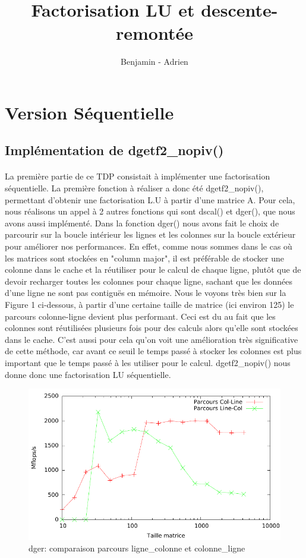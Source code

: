 \documentclass{article}
\title{Factorisation LU et descente-remontée}
\author{Benjamin \bsc{Angelaud} - Adrien \bsc{Guilbaud}}
\begin{document}
\maketitle

\section{Version Séquentielle}
\subsection{Implémentation de dgetf2\_nopiv()}
\paragraph{}La première partie de ce TDP consistait à implémenter une factorisation séquentielle. La première fonction à réaliser a donc été dgetf2\_nopiv(), permettant d'obtenir une factorisation L.U à partir d'une matrice A.  Pour cela, nous réalisons un appel à 2 autres fonctions qui sont dscal() et dger(), que nous avons aussi implémenté. Dans la fonction dger() nous avons fait le choix de parcourir sur la boucle intérieur les lignes et les colonnes sur la boucle extérieur pour améliorer nos performances. En effet, comme nous sommes dans le cas où les matrices sont stockées en "column major", il est préférable de stocker une colonne dans le cache et la réutiliser pour le calcul de chaque ligne, plutôt que de devoir recharger toutes les colonnes pour chaque ligne, sachant que les données d'une ligne ne sont pas contiguës en mémoire. Nous le voyons très bien sur la Figure 1 ci-dessous, à partir d'une certaine taille de matrice (ici environ 125) le parcours colonne-ligne devient plus performant. Ceci est du au fait que les colonnes sont réutilisées plusieurs fois pour des calculs alors qu'elle sont stockées dans le cache. C'est aussi pour cela qu'on voit une amélioration très significative de cette méthode, car avant ce seuil le temps passé à stocker les colonnes est plus important que le temps passé à les utiliser pour le calcul.  dgetf2\_nopiv() nous donne donc une factorisation LU séquentielle.

\begin{figure}[!h]
	\begin{center}
		\includegraphics[scale=0.5]{pictures/dger.pdf}
	\end{center}
	\caption{dger: comparaison parcours ligne\_colonne et colonne\_ligne \label{fig:dger}}
\end{figure}
\end{document}
